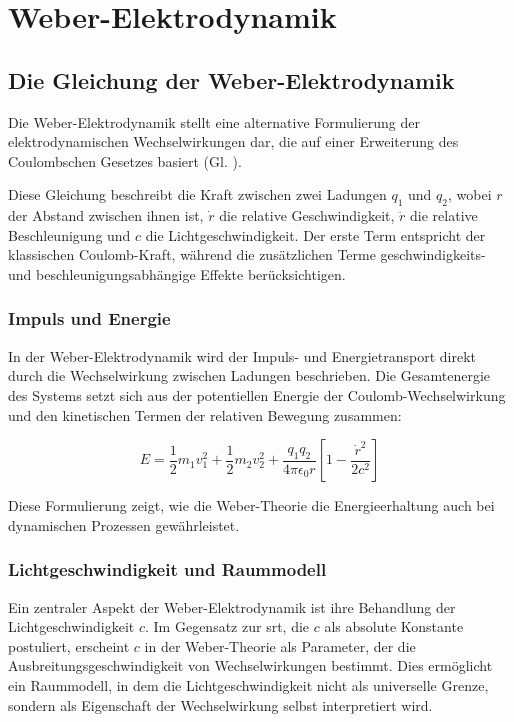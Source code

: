 \chapter{Weber-Elektrodynamik}
\section{Die Gleichung der Weber-Elektrodynamik}
Die Weber-Elektrodynamik stellt eine alternative Formulierung der elektrodynamischen Wechselwirkungen dar, die auf einer Erweiterung des Coulombschen Gesetzes basiert (Gl. ).

Diese Gleichung beschreibt die Kraft zwischen zwei Ladungen $q_1$ und $q_2$, wobei $r$ der Abstand zwischen ihnen ist, $\dot{r}$ die relative Geschwindigkeit, $\ddot{r}$ die relative
Beschleunigung und $c$ die Lichtgeschwindigkeit. Der erste Term entspricht der klassischen Coulomb-Kraft, während die zusätzlichen Terme geschwindigkeits- und beschleunigungsabhängige
Effekte berücksichtigen.

\subsection{Impuls und Energie}
In der Weber-Elektrodynamik wird der Impuls- und Energietransport direkt durch die Wechselwirkung zwischen Ladungen beschrieben. Die Gesamtenergie des Systems setzt sich aus der potentiellen
Energie der Coulomb-Wechselwirkung und den kinetischen Termen der relativen Bewegung zusammen:

\begin{equation}
    E = \frac{1}{2} m_1 v_1^2 + \frac{1}{2} m_2 v_2^2 + \frac{q_1 q_2}{4 \pi \epsilon_0 r} \left[ 1 - \frac{\dot{r}^2}{2c^2} \right]    
\end{equation}

Diese Formulierung zeigt, wie die Weber-Theorie die Energieerhaltung auch bei dynamischen Prozessen gewährleistet.

\subsection{Lichtgeschwindigkeit und Raummodell}
Ein zentraler Aspekt der Weber-Elektrodynamik ist ihre Behandlung der Lichtgeschwindigkeit $c$. Im Gegensatz zur \gls{srt}, die $c$ als absolute Konstante postuliert,
erscheint $c$ in der Weber-Theorie als Parameter, der die Ausbreitungsgeschwindigkeit von Wechselwirkungen bestimmt. Dies ermöglicht ein Raummodell, in dem die Lichtgeschwindigkeit
nicht als universelle Grenze, sondern als Eigenschaft der Wechselwirkung selbst interpretiert wird.

